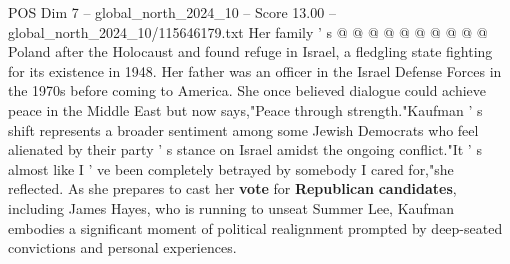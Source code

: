 \begin{textsample}{POS Dim 7 – global\_north\_2024\_10 – Score 13.00 – global\_north\_2024\_10/115646179.txt}
Her family ' s @ @ @ @ @ @ @ @ @ @ Poland after the Holocaust and found refuge in Israel, a fledgling state fighting for its existence in 1948.
Her father was an officer in the Israel Defense Forces in the 1970s before coming to America.
She once believed dialogue could achieve peace in the Middle East but now says,"Peace through strength."Kaufman ' s shift represents a broader sentiment among some Jewish Democrats who feel alienated by their party ' s stance on Israel amidst the ongoing conflict."It ' s almost like I ' ve been completely betrayed by somebody I cared for,"she reflected.
As she prepares to cast her \textbf{vote} for \textbf{Republican} \textbf{candidates}, including James Hayes, who is running to unseat Summer Lee, Kaufman embodies a significant moment of political realignment prompted by deep-seated convictions and personal experiences.

\end{textsample}
